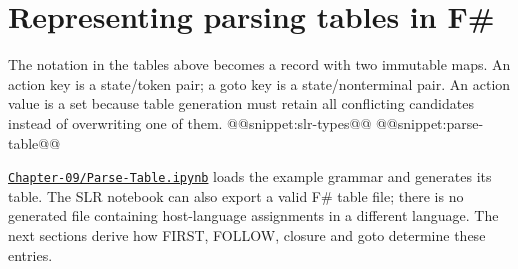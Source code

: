 \section{Representing parsing tables in F\#}
The notation in the tables above becomes a record with two immutable maps.
An action key is a state/token pair; a goto key is a state/nonterminal pair.
An action value is a set because table generation must retain all conflicting candidates instead of overwriting one of them.
@@snippet:slr-types@@
@@snippet:parse-table@@

\href{../../Chapter-09/Parse-Table.ipynb}{\nolinkurl{Chapter-09/Parse-Table.ipynb}} loads the example grammar and generates its table.
The SLR notebook can also export a valid F\# table file; there is no generated file containing host-language assignments in a different language.
The next sections derive how FIRST, FOLLOW, closure and goto determine these entries.
